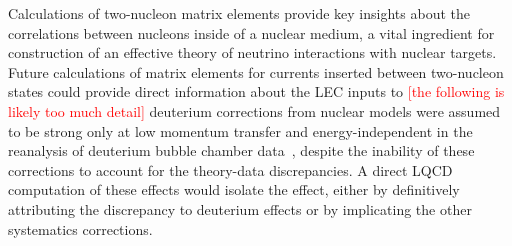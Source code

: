
Calculations of two-nucleon matrix elements provide key insights
 about the correlations between nucleons inside of a nuclear medium,
 a vital ingredient for construction of an effective theory
 of neutrino interactions with nuclear targets.
%
Future calculations of matrix elements for currents inserted between
 two-nucleon states could provide direct information about the LEC inputs to 
\textcolor{red}{[the following is likely too much detail]}
 deuterium corrections from nuclear models were assumed to be strong only at low momentum transfer
 and energy-independent in the reanalysis of deuterium bubble chamber data~\cite{Meyer:2016oeg},
 despite the inability of these corrections to account for the theory-data discrepancies.
A direct LQCD computation of these effects would isolate the effect,
 either by definitively attributing the discrepancy to deuterium effects
 or by implicating the other systematics corrections.
